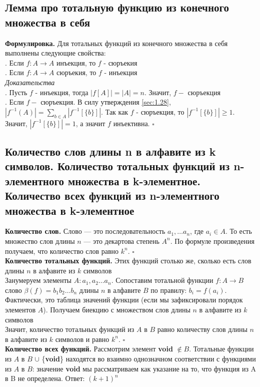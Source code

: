 \documentclass[a4paper]{article}
\newcommand{\qed}{\hfill$\square$}
\begin{document}
\subsection{Лемма про тотальную функцию из конечного множества в себя}
\textbf{Формулировка.} Для тотальных функций из конечного множества в себя выполнены следующие свойства:\\[2mm]
. Если $f: A\rightarrow A$ инъекция, то $f$ - сюръекия\\[2mm]
. Если $f: A\rightarrow A$ сюръекия, то $f$ - инъекция\\[2mm]
\textit{Доказательства}\\[2mm]
. Пусть $f$ - инъекция, тогда $|f[A]|=|A|=n$. Значит, $f-$ сюръекция\\[2mm]
. Если $f-$ сюръекция. В силу утверждения \ref{sec:1.28}, $|f^{-1}(A)|=\sum\limits_{b\in A} |f^{-1}[\{b\}]|.$ Так как $f$ - сюръекция, то $|f^{-1}[\{b\}]|\geqslant1$. Значит, $|f^{-1}[\{b\}]|=1$, а значит $f$ инъективна. \qed
\subsection{Количество слов длины n в алфавите из k символов. Количество тотальных функций из n-элементного множества в k-элементное. Количество всех функций из n-элементного множества в k-элементное}
\textbf{Количество слов.} Слово — это последовательность $a_1,\ldots a_n$, где $a_i\in A$. То есть множество слов длины $n$ — это декартова степень $A^n$. По формуле произведения получаем, что количество слов равно $k^n$. \qed\\[2mm]
\textbf{Количество тотальных функций.} Этих функций столько же, сколько есть слов длины $n$ в алфавите из $k$ символов\\[2mm]
\indent Занумеруем элементы $A: a_1,a_2\ldots a_n$. Сопоставим тотальной функции $f: A\rightarrow B$ слово $\beta(f)=b_1b_2\ldots b_n$ длины $n$ в алфавите $B$ по правилу: $b_i=f(a_i)$. Фактически, это таблица значений функции (если мы зафиксировали порядок элементов $A$). Получаем биекцию с множеством слов длины $n$ в алфавите из $k$ символов\\[2mm]
\indent Значит, количество тотальных функций из $A$ в $B$ равно количеству слов длины $n$ в алфавите из $k$ символов и равно $k^n$. \qed\\[2mm]
\textbf{Количество всех функций.} Рассмотрим элемент \textbf{void} $\notin B$. Тотальные функции из $A$ в $B$ $\cup$ \{\textbf{void}\} находятся во взаимно однозначном соответствии с функциями из $A$ в $B$: значение \textbf{void} мы рассматриваем как указание на то, что функция из A в B не определена. Ответ: $(k+1)^n$
\end{document}
